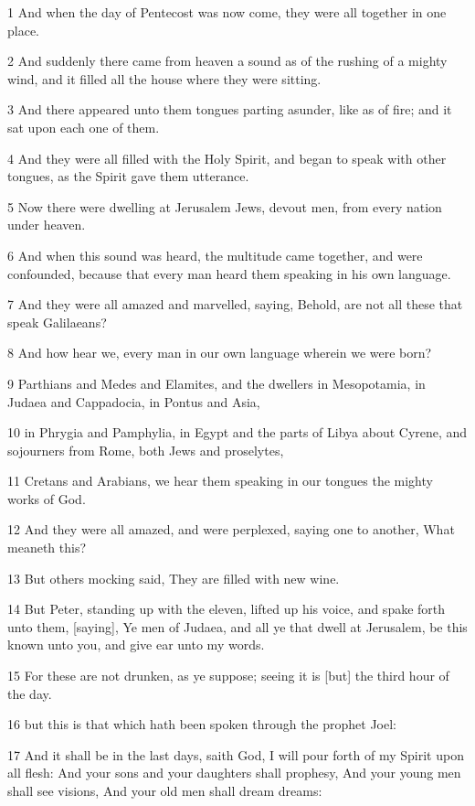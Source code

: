 \par 1 And when the day of Pentecost was now come, they were all together in one place.
\par 2 And suddenly there came from heaven a sound as of the rushing of a mighty wind, and it filled all the house where they were sitting.
\par 3 And there appeared unto them tongues parting asunder, like as of fire; and it sat upon each one of them.
\par 4 And they were all filled with the Holy Spirit, and began to speak with other tongues, as the Spirit gave them utterance.
\par 5 Now there were dwelling at Jerusalem Jews, devout men, from every nation under heaven.
\par 6 And when this sound was heard, the multitude came together, and were confounded, because that every man heard them speaking in his own language.
\par 7 And they were all amazed and marvelled, saying, Behold, are not all these that speak Galilaeans?
\par 8 And how hear we, every man in our own language wherein we were born?
\par 9 Parthians and Medes and Elamites, and the dwellers in Mesopotamia, in Judaea and Cappadocia, in Pontus and Asia,
\par 10 in Phrygia and Pamphylia, in Egypt and the parts of Libya about Cyrene, and sojourners from Rome, both Jews and proselytes,
\par 11 Cretans and Arabians, we hear them speaking in our tongues the mighty works of God.
\par 12 And they were all amazed, and were perplexed, saying one to another, What meaneth this?
\par 13 But others mocking said, They are filled with new wine.
\par 14 But Peter, standing up with the eleven, lifted up his voice, and spake forth unto them, [saying], Ye men of Judaea, and all ye that dwell at Jerusalem, be this known unto you, and give ear unto my words.
\par 15 For these are not drunken, as ye suppose; seeing it is [but] the third hour of the day.
\par 16 but this is that which hath been spoken through the prophet Joel:
\par 17 And it shall be in the last days, saith God, I will pour forth of my Spirit upon all flesh: And your sons and your daughters shall prophesy, And your young men shall see visions, And your old men shall dream dreams:
